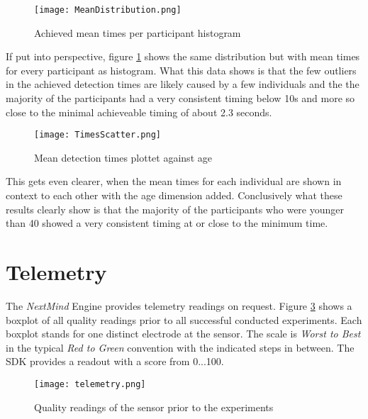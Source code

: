             \begin{figure}[h]     %
                \centering
                \texttt{[image: MeanDistribution.png]} 
                \caption{Achieved mean times per participant histogram}\label{mean-dist}
            \end{figure} 

            If put into perspective, figure \ref*{mean-dist} shows the same distribution but with mean times for every participant as histogram. What this data shows is that the few outliers in the achieved detection times are likely caused by a few individuals and the the majority of the participants had a very consistent timing below 10s and more so close to the minimal achieveable timing of about 2.3 seconds.

            \begin{figure}[h]     %
                \centering
                \texttt{[image: TimesScatter.png]} 
                \caption{Mean detection times plottet against age}\label{time-scatter}
            \end{figure} 

            This gets even clearer, when the mean times for each individual are shown in context to each other with the age dimension added. Conclusively what these results clearly show is that the majority of the participants who were younger than 40 showed a very consistent timing at or close to the minimum time.

        \section{Telemetry}

            The \textit{NextMind} Engine provides telemetry readings on request. Figure \ref*{telemetry} shows a boxplot of all quality readings prior to all successful conducted experiments. Each boxplot stands for one distinct electrode at the sensor. The scale is \textit{Worst to Best} in the typical \textit{Red to Green} convention with the indicated steps in between. The SDK provides a readout with a score from 0...100. 

            \begin{figure}[h]     %
                \centering
                \texttt{[image: telemetry.png]} 
                \caption{Quality readings of the sensor prior to the experiments}\label{telemetry}
            \end{figure} 
            

